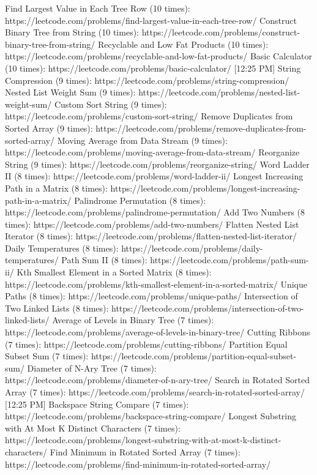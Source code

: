 Find Largest Value in Each Tree Row (10 times): https://leetcode.com/problems/find-largest-value-in-each-tree-row/
Construct Binary Tree from String (10 times): https://leetcode.com/problems/construct-binary-tree-from-string/
Recyclable and Low Fat Products (10 times): https://leetcode.com/problems/recyclable-and-low-fat-products/
Basic Calculator (10 times): https://leetcode.com/problems/basic-calculator/
[12:25 PM]
String Compression (9 times): https://leetcode.com/problems/string-compression/
Nested List Weight Sum (9 times): https://leetcode.com/problems/nested-list-weight-sum/
Custom Sort String (9 times): https://leetcode.com/problems/custom-sort-string/
Remove Duplicates from Sorted Array (9 times): https://leetcode.com/problems/remove-duplicates-from-sorted-array/
Moving Average from Data Stream (9 times): https://leetcode.com/problems/moving-average-from-data-stream/
Reorganize String (9 times): https://leetcode.com/problems/reorganize-string/
Word Ladder II (8 times): https://leetcode.com/problems/word-ladder-ii/
Longest Increasing Path in a Matrix (8 times): https://leetcode.com/problems/longest-increasing-path-in-a-matrix/
Palindrome Permutation (8 times): https://leetcode.com/problems/palindrome-permutation/
Add Two Numbers (8 times): https://leetcode.com/problems/add-two-numbers/
Flatten Nested List Iterator (8 times): https://leetcode.com/problems/flatten-nested-list-iterator/
Daily Temperatures (8 times): https://leetcode.com/problems/daily-temperatures/
Path Sum II (8 times): https://leetcode.com/problems/path-sum-ii/
Kth Smallest Element in a Sorted Matrix (8 times): https://leetcode.com/problems/kth-smallest-element-in-a-sorted-matrix/
Unique Paths (8 times): https://leetcode.com/problems/unique-paths/
Intersection of Two Linked Lists (8 times): https://leetcode.com/problems/intersection-of-two-linked-lists/
Average of Levels in Binary Tree (7 times): https://leetcode.com/problems/average-of-levels-in-binary-tree/
Cutting Ribbons (7 times): https://leetcode.com/problems/cutting-ribbons/
Partition Equal Subset Sum (7 times): https://leetcode.com/problems/partition-equal-subset-sum/
Diameter of N-Ary Tree (7 times): https://leetcode.com/problems/diameter-of-n-ary-tree/
Search in Rotated Sorted Array (7 times): https://leetcode.com/problems/search-in-rotated-sorted-array/
[12:25 PM]
Backspace String Compare (7 times): https://leetcode.com/problems/backspace-string-compare/
Longest Substring with At Most K Distinct Characters (7 times): https://leetcode.com/problems/longest-substring-with-at-most-k-distinct-characters/
Find Minimum in Rotated Sorted Array (7 times): https://leetcode.com/problems/find-minimum-in-rotated-sorted-array/
